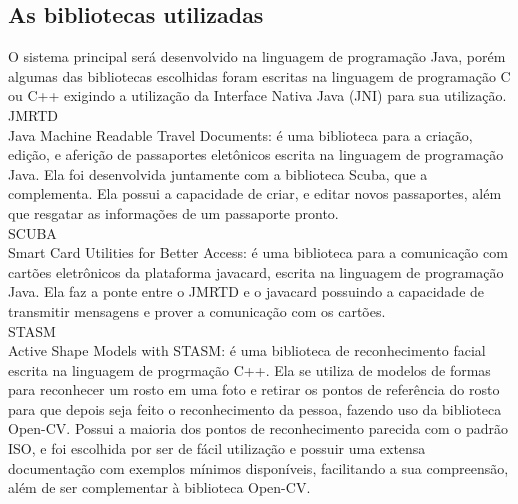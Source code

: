 \documentclass{article}
\begin{document}
	\subsection{As bibliotecas utilizadas}
		\begin{justify}
			 
		\hspace{2cm}O sistema principal será desenvolvido na linguagem de programação Java, porém algumas das bibliotecas escolhidas foram escritas na linguagem de programação C ou C++ exigindo a utilização da Interface Nativa Java (JNI) para sua utilização.\\
		
        \hspace*{2cm}JMRTD\cite{JMRTD}\\
    \hspace*{2cm}Java Machine Readable Travel Documents: é uma biblioteca para a criação, edição, e aferição de passaportes eletônicos escrita na linguagem de programação Java. Ela foi desenvolvida juntamente com a biblioteca Scuba, que a complementa. Ela possui a capacidade de criar, e editar novos passaportes, além que resgatar as informações de um passaporte pronto. \\
        
		\hspace*{2cm}SCUBA\cite{SCUBA}\\
    \hspace*{2cm}Smart Card Utilities for Better Access: é uma biblioteca para a comunicação com cartões eletrônicos da plataforma javacard, escrita na linguagem de programação Java. Ela faz a ponte entre o JMRTD e o javacard possuindo a capacidade de transmitir mensagens e prover a comunicação com os cartões.\\
		
        \hspace*{2cm}STASM\cite{STASM}\\
    \hspace*{2cm}Active Shape Models with STASM: é uma biblioteca de reconhecimento facial escrita na linguagem de progrmação C++. Ela se utiliza de modelos de formas para reconhecer um rosto em uma foto e retirar os pontos de referência do rosto para que depois seja feito o reconhecimento da pessoa, fazendo uso da biblioteca Open-CV. Possui a maioria dos pontos de reconhecimento parecida com o padrão ISO\cite{ISO}, e foi escolhida por ser de fácil utilização e possuir uma extensa documentação com exemplos mínimos disponíveis, facilitando a sua compreensão, além de ser complementar à biblioteca Open-CV.\\
		

\end{justify}
\end{document}
